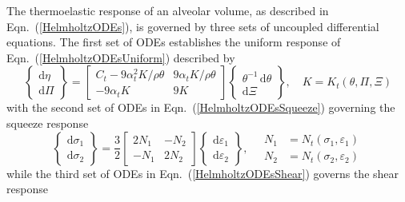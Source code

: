 The thermo\-elastic response of an alveolar volume, as described in Eqn.~(\ref{HelmholtzODEs}), is governed by three sets of uncoupled differential equations.  The first set of ODEs establishes the uniform response of Eqn.~(\ref{HelmholtzODEsUniform}) described by
\begin{displaymath}
\left\{ \begin{matrix}
\mathrm{d} \eta \\ \mathrm{d} \Pi 
\end{matrix} \right\} = \begin{bmatrix}
C_t - 9 \alpha^2_t K / \rho \theta & 9 \alpha_t K / \rho \theta \\
-9 \alpha_t K & 9K
\end{bmatrix} \left\{ \begin{matrix}
\theta^{-1} \, \mathrm{d} \theta \\ \mathrm{d} \Xi 
\end{matrix} \right\} , \quad
K = K_t ( \theta , \Pi , \Xi )
\end{displaymath}
with the second set of ODEs in Eqn.~(\ref{HelmholtzODEsSqueeze}) governing the squeeze response
\begin{displaymath}
\left\{ \begin{matrix}
\mathrm{d} \sigma_1 \\ \mathrm{d} \sigma_2
\end{matrix} \right\} = \frac{3}{2} \begin{bmatrix}
2 N_1 & -N_2 \\
-N_1 & 2N_2
\end{bmatrix} \left\{ \begin{matrix}
\mathrm{d} \varepsilon_1 \\ \mathrm{d} \varepsilon_2
\end{matrix} \right\} , \quad
\begin{aligned}
N_1 & = N_t ( \sigma_1 , \varepsilon_1 ) \\
N_2 & = N_t ( \sigma_2 , \varepsilon_2 )
\end{aligned}
\end{displaymath}
while the third set of ODEs in Eqn.~(\ref{HelmholtzODEsShear}) governs the shear response
